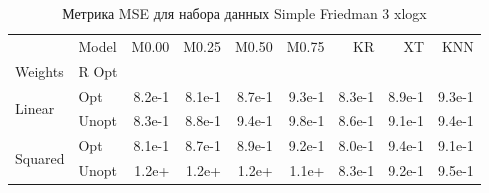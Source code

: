 \begin{table}
\caption{Метрика MSE для набора данных Simple Friedman 3 xlogx}
\label{tab:MSE_Simple Friedman 3 xlogx}
\begin{tabular}{llrrrrrrr}
\toprule
 & Model & M0.00 & M0.25 & M0.50 & M0.75 & KR & XT & KNN \\
Weights & R Opt &  &  &  &  &  &  &  \\
\midrule
\multirow[t]{2}{*}{Linear} & Opt & 8.2e-1 & 8.1e-1 & 8.7e-1 & 9.3e-1 & 8.3e-1 & 8.9e-1 & 9.3e-1 \\
 & Unopt & 8.3e-1 & 8.8e-1 & 9.4e-1 & 9.8e-1 & 8.6e-1 & 9.1e-1 & 9.4e-1 \\

\multirow[t]{2}{*}{Squared} & Opt & 8.1e-1 & 8.7e-1 & 8.9e-1 & 9.2e-1 & 8.0e-1 & 9.4e-1 & 9.1e-1 \\
 & Unopt & 1.2e+ & 1.2e+ & 1.2e+ & 1.1e+ & 8.3e-1 & 9.2e-1 & 9.5e-1 \\

\bottomrule
\end{tabular}
\end{table}
